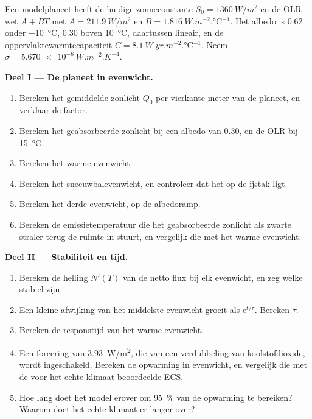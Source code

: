 \begin{problem}
\label{pb:b3:climate-models:1}
Een modelplaneet heeft de huidige zonneconstante $S_0 = \qty{1360}{W/m^2}$ en de
OLR-wet $A + BT$ met $A = \qty{211.9}{W/m^2}$ en $B =
\qty{1.816}{W.m^{-2}.\celsius^{-1}}$. Het albedo is 0.62 onder
\qty{-10}{\celsius}, 0.30 boven \qty{+10}{\celsius}, daartussen lineair, en
de oppervlaktewarmtecapaciteit $C = \qty{8.1}{W.yr.m^{-2}.\celsius^{-1}}$. Neem
$\sigma = \qty{5.670e-8}{W.m^{-2}.K^{-4}}$.

\medskip\noindent\textbf{Deel I --- De planeet in evenwicht.}
\begin{enumerate}
\item Bereken het gemiddelde zonlicht $Q_0$ per vierkante meter van de planeet, en
  verklaar de factor.
\item Bereken het geabsorbeerde zonlicht bij een albedo van 0.30, en de OLR bij
  \qty{15}{\celsius}.
\item Bereken het warme evenwicht.
\item Bereken het sneeuwbalevenwicht, en controleer dat het op de
  ijstak ligt.
\item Bereken het derde evenwicht, op de albedoramp.
\item Bereken de emissietemperatuur die het geabsorbeerde zonlicht
  als zwarte straler terug de ruimte in stuurt, en vergelijk die met het warme evenwicht.
\end{enumerate}

\medskip\noindent\textbf{Deel II --- Stabiliteit en tijd.}
\begin{enumerate}[resume]
\item Bereken de helling $N'(T)$ van de netto flux bij elk evenwicht, en zeg
  welke stabiel zijn.
\item Een kleine afwijking van het middelste evenwicht groeit als $\mathrm
  e^{t/\tau}$. Bereken $\tau$.
\item Bereken de responstijd van het warme evenwicht.
\item Een forcering van \qty{3.93}{W/m^2}, die van een verdubbeling van koolstofdioxide,
  wordt ingeschakeld. Bereken de opwarming in evenwicht, en vergelijk die met
  de voor het echte klimaat beoordeelde ECS.
\item Hoe lang doet het model erover om \qty{95}{\percent} van de
  opwarming te bereiken? Waarom doet het echte klimaat er langer over?
\end{enumerate}


\end{problem}
